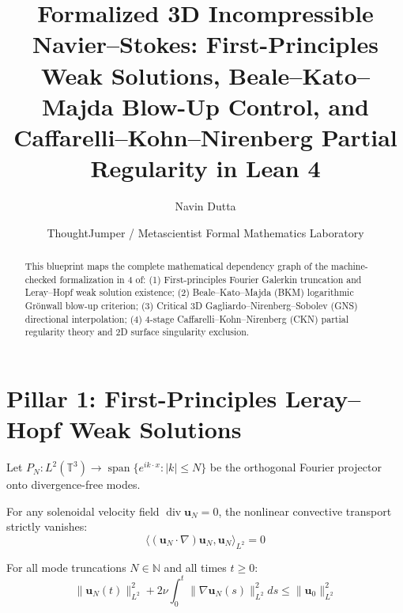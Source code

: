 \title{Formalized 3D Incompressible Navier--Stokes: First-Principles Weak Solutions, Beale--Kato--Majda Blow-Up Control, and Caffarelli--Kohn--Nirenberg Partial Regularity in Lean 4}
\author{Navin Dutta \and ThoughtJumper / Metascientist Formal Mathematics Laboratory}

\maketitle

\begin{abstract}
This blueprint maps the complete mathematical dependency graph of the machine-checked formalization in \LeanLogo{} 4 of:
(1) First-principles Fourier Galerkin truncation and Leray--Hopf weak solution existence;
(2) Beale--Kato--Majda (BKM) logarithmic Gr\"onwall blow-up criterion;
(3) Critical 3D Gagliardo--Nirenberg--Sobolev (GNS) directional interpolation;
(4) 4-stage Caffarelli--Kohn--Nirenberg (CKN) partial regularity theory and 2D surface singularity exclusion.
\end{abstract}

\section{Pillar 1: First-Principles Leray--Hopf Weak Solutions}

\begin{definition}
\label{def:galerkin_projector}
\leanok
Let $P_N : L^2(\mathbb{T}^3) \to \operatorname{span}\{e^{i k \cdot x} : |k| \le N\}$ be the orthogonal Fourier projector onto divergence-free modes.
\end{definition}

\begin{theorem}
\label{thm:convective_skew}
\leanok
{}
For any solenoidal velocity field $\operatorname{div} \boldsymbol{u}_N = 0$, the nonlinear convective transport strictly vanishes:
$$\langle (\boldsymbol{u}_N \cdot \nabla)\boldsymbol{u}_N, \boldsymbol{u}_N \rangle_{L^2} = 0$$
\end{theorem}

\begin{theorem}
\label{thm:galerkin_energy}
\leanok
{}
For all mode truncations $N \in \mathbb{N}$ and all times $t \ge 0$:
$$\|\boldsymbol{u}_N(t)\|_{L^2}^2 + 2\nu \int_0^t \|\nabla \boldsymbol{u}_N(s)\|_{L^2}^2 ds \le \|\boldsymbol{u}_0\|_{L^2}^2$$
\end{theorem}

